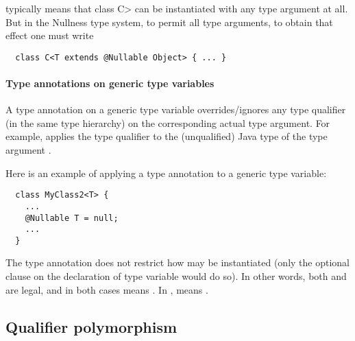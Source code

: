 \noindent
typically means that class \<C> can be instantiated with any type argument at
all.  But in the Nullness type system, to permit all type arguments, to
obtain that effect one must write

\begin{Verbatim}
  class C<T extends @Nullable Object> { ... }
\end{Verbatim}


\paragraph{Type annotations on generic type variables}

A type annotation on a generic type variable overrides/ignores any type
qualifier (in the same type hierarchy) on the corresponding actual type
argument.  For example,
 applies the type qualifier  to the
(unqualified) Java type of the type argument .

Here is an example of applying a type annotation to a generic type
variable:

\begin{Verbatim}
  class MyClass2<T> {
    ...
    @Nullable T = null;
    ...
  }
\end{Verbatim}

\noindent
The type annotation does not restrict how  may be instantiated
(only the optional  clause on the declaration of type
variable  would do so).  In other words, both 
 and  are
legal, and in both cases  means .
In , 
 means .





\subsection{Qualifier polymorphism\label{qualifier-polymorphism}}

